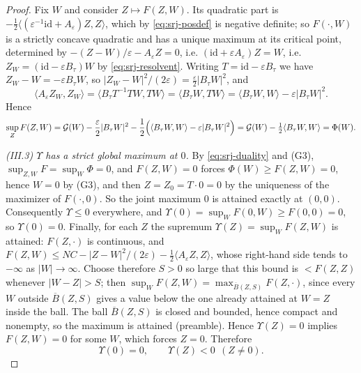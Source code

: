 \begin{proof}
Fix $W$ and consider $Z\mapsto F(Z,W)$. Its quadratic part is
$-\tfrac12\langle(\varepsilon^{-1}\mathrm{id}+A_\varepsilon)Z,Z\rangle$, which
by \eqref{eq:srj-posdef} is negative definite; so $F(\cdot,W)$ is a strictly
concave quadratic and has a unique maximum at its critical point, determined by
$-(Z-W)/\varepsilon-A_\varepsilon Z=0$, i.e.
$(\mathrm{id}+\varepsilon A_\varepsilon)Z=W$, i.e.
$Z_W=(\mathrm{id}-\varepsilon B_\tau)W$ by \eqref{eq:srj-resolvent}. Writing
$T=\mathrm{id}-\varepsilon B_\tau$ we have $Z_W-W=-\varepsilon B_\tau W$, so
$|Z_W-W|^2/(2\varepsilon)=\tfrac{\varepsilon}{2}|B_\tau W|^2$, and
\[
  \langle A_\varepsilon Z_W,Z_W\rangle
   =\langle B_\tau T^{-1}TW,TW\rangle=\langle B_\tau W,TW\rangle
   =\langle B_\tau W,W\rangle-\varepsilon|B_\tau W|^2 .
\]
Hence
\begin{equation}\label{eq:srj-duality}
  \sup_ZF(Z,W)=\mathcal G(W)-\frac{\varepsilon}{2}|B_\tau W|^2
   -\frac12\Bigl(\langle B_\tau W,W\rangle-\varepsilon|B_\tau W|^2\Bigr)
   =\mathcal G(W)-\tfrac12\langle B_\tau W,W\rangle=\Phi(W).
\end{equation}

\emph{(III.3) $\Upsilon$ has a strict global maximum at $0$.}
By \eqref{eq:srj-duality} and (G3),
$\sup_{Z,W}F=\sup_W\Phi=0$, and $F(Z,W)=0$ forces $\Phi(W)\ge F(Z,W)=0$, hence
$W=0$ by (G3), and then $Z=Z_0=T\cdot0=0$ by the uniqueness of the maximizer of
$F(\cdot,0)$. So the joint maximum $0$ is attained exactly at $(0,0)$.
Consequently $\Upsilon\le0$ everywhere, and
$\Upsilon(0)=\sup_WF(0,W)\ge F(0,0)=0$, so $\Upsilon(0)=0$. Finally, for each
$Z$ the supremum $\Upsilon(Z)=\sup_WF(Z,W)$ is attained: $F(Z,\cdot)$ is
continuous, and $F(Z,W)\le NC-|Z-W|^2/(2\varepsilon)
-\tfrac12\langle A_\varepsilon Z,Z\rangle$, whose right-hand side tends to
$-\infty$ as $|W|\to\infty$. Choose therefore $S>0$ so large that this bound is
$<F(Z,Z)$ whenever $|W-Z|>S$; then $\sup_WF(Z,W)
=\max_{\overline B(Z,S)}F(Z,\cdot)$, since every $W$ outside
$\overline B(Z,S)$ gives a value below the one already attained at $W=Z$
inside the ball. The ball $\overline B(Z,S)$ is closed and bounded, hence
compact and nonempty, so the maximum is attained (preamble). Hence
$\Upsilon(Z)=0$ implies $F(Z,W)=0$ for some $W$, which forces $Z=0$.
Therefore
\begin{equation}\label{eq:srj-strict}
  \Upsilon(0)=0,\qquad \Upsilon(Z)<0\ \ (Z\ne0).
\end{equation}


\end{proof}
